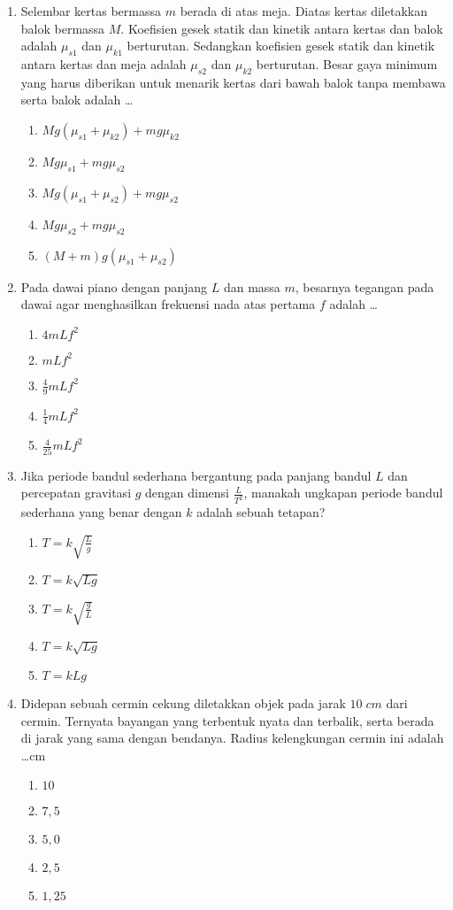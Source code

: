\documentclass[A4,12PT, english, twocolumn]{journal}
\begin{document}
\begin{enumerate}
\item Selembar kertas bermassa $m$ berada di atas meja. Diatas kertas diletakkan balok bermassa $M$. Koefisien gesek statik dan kinetik antara kertas dan balok adalah $\mu_{s1}$ dan $\mu_{k1}$ berturutan. Sedangkan koefisien gesek statik dan kinetik antara kertas dan meja adalah $\mu_{s2}$ dan $\mu_{k2}$ berturutan. Besar gaya minimum yang harus diberikan untuk menarik kertas dari bawah balok tanpa membawa serta balok adalah \dots
    \begin{enumerate}
        \item $Mg(\mu_{s1}+\mu_{k2})+mg \mu_{k2}$
        \item $Mg\mu_{s1}+mg\mu_{s2}$
        \item $Mg(\mu_{s1}+\mu_{s2})+mg \mu_{s2}$
        \item $Mg\mu_{s2}+mg\mu_{s2}$
        \item $(M+m)g(\mu_{s1}+\mu_{s2})$
    \end{enumerate}
    
\item Pada dawai piano dengan panjang $L$ dan massa $m$, besarnya tegangan pada dawai agar menghasilkan frekuensi nada atas pertama $f$ adalah \dots
    \begin{enumerate}
        \item $4mLf^2$
        \item $mLf^2$
        \item $\frac{4}{9} mLf^2$
        \item $\frac{1}{4} mLf^2$
        \item $\frac{4}{25} mLf^2$
    \end{enumerate}
    
\item Jika periode bandul sederhana bergantung pada panjang bandul $L$ dan percepatan gravitasi $g$ dengan dimensi $\frac{L}{T^2}$, manakah ungkapan periode bandul sederhana yang benar dengan $k$ adalah sebuah tetapan?
    \begin{enumerate}
        \item $T=k \sqrt{\frac{L}{g}}$
        \item $T=k \sqrt{Lg}$
        \item $T=k \sqrt{\frac{g}{L}}$
        \item $T=k \sqrt{Lg}$
        \item $T=kLg$
    \end{enumerate}
    
\item Didepan sebuah cermin cekung diletakkan objek pada jarak $10 \; cm$ dari cermin. Ternyata bayangan yang terbentuk nyata dan terbalik, serta berada di jarak yang sama dengan bendanya. Radius kelengkungan cermin ini adalah \dots cm
	\begin{enumerate}
		\item $10$
		\item $7,5$
		\item $5,0$
		\item $2,5$
		\item $1,25$
	\end{enumerate}
	

\end{enumerate}
\end{document}
